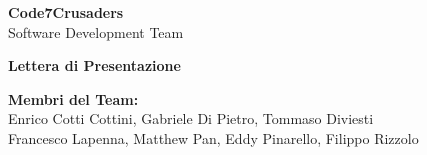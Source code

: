 \documentclass{article}
\begin{document}
\begin{titlepage}
    {\Huge \textbf{Code7Crusaders}}\\
    \vspace{0.5cm}
    {\Large Software Development Team}\\
    \vspace{2cm}
    
    {\large \textbf{Lettera di Presentazione}}\\
    \vspace{5cm}

    \textbf{Membri del Team:}\\
    Enrico Cotti Cottini, Gabriele Di Pietro, Tommaso Diviesti \\
    Francesco Lapenna, Matthew Pan, Eddy Pinarello, Filippo Rizzolo \\
    \vspace{0.5cm}
    
    \vspace{1cm}
\end{titlepage}
\end{document}
